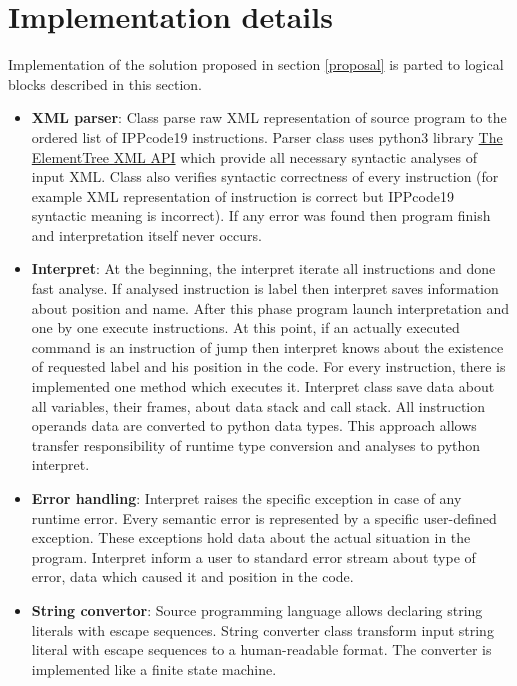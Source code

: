 \documentclass[a4paper, 10pt]{article}
\begin{document}
\section{Implementation details}
Implementation of the solution proposed in section \ref{proposal} is parted to logical blocks described in this section.
\begin{itemize}
\item \textbf{XML parser}: Class parse raw XML representation of source program to the ordered list of IPPcode19 instructions. Parser class uses python3 library \href{https://docs.python.org/2/library/xml.etree.elementtree.html}{The ElementTree XML API} which provide all necessary syntactic analyses of input XML. Class also verifies syntactic correctness of every instruction (for example XML representation of instruction is correct but IPPcode19 syntactic meaning is incorrect). If any error was found then program finish and interpretation itself never occurs.
\item \textbf{Interpret}: At the beginning, the interpret iterate all instructions and done fast analyse. If analysed instruction is label then interpret saves information about position and name. After this phase program launch interpretation and one by one execute instructions. At this point, if an actually executed command is an instruction of jump then interpret knows about the existence of requested label and his position in the code. For every instruction, there is implemented one method which executes it. Interpret class save data about all variables, their frames, about data stack and call stack. All instruction operands data are converted to python data types. This approach allows transfer responsibility of runtime type conversion and analyses to python interpret. 
\item \textbf{Error handling}: Interpret raises the specific exception in case of any runtime error. Every semantic error is represented by a specific user-defined exception. These exceptions hold data about the actual situation in the program. Interpret inform a user to standard error stream about type of error, data which caused it and position in the code.
\item \textbf{String convertor}: Source programming language allows declaring string literals with escape sequences. String converter class transform input string literal with escape sequences to a human-readable format. The converter is implemented like a finite state machine.
\end{itemize}
\end{document}
